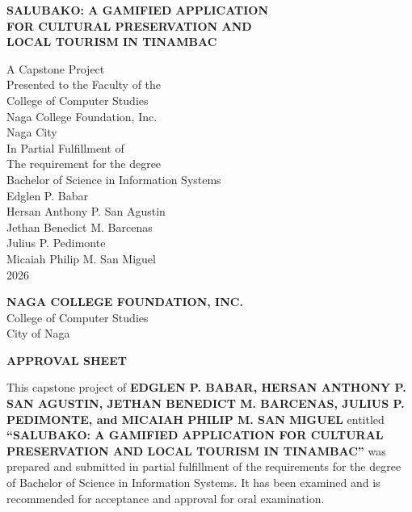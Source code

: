 \documentclass{research}
\newcommand{\ncfletterhead}{%
  \begin{center}
    {\bfseries NAGA COLLEGE FOUNDATION, INC.}\\[0.3em]
    College of Computer Studies\\[0.3em]
    City of Naga
  \end{center}
  \vspace{1em}
}
\begin{document}
\thispagestyle{empty}
\begin{center}
  \vspace*{1in}
  {\large\bfseries SALUBAKO: A GAMIFIED APPLICATION\\ 
  FOR CULTURAL PRESERVATION AND \\
  LOCAL TOURISM IN TINAMBAC \par}
  \vspace{0.75in}
  A Capstone Project\\
  Presented to the Faculty of the\\
  College of Computer Studies\\
  Naga College Foundation, Inc.\\
  Naga City\\
  \vspace{0.75in}
  In Partial Fulfillment of\\
  The requirement for the degree\\
  Bachelor of Science in Information Systems\\
  \vspace{0.5in}
  Edglen P. Babar\\
  Hersan Anthony P. San Agustin\\
  Jethan Benedict M. Barcenas\\
  Julius P. Pedimonte\\
  Micaiah Philip M. San Miguel\\
  \vspace*{0.5in}
  2026
\end{center}
\clearpage

\setcounter{page}{2}
\ncfletterhead

\begin{center}
  {\bfseries APPROVAL SHEET}
\end{center}

\vspace{0.5em}

\noindent
This capstone project of \textbf{EDGLEN P. BABAR, HERSAN ANTHONY P. SAN AGUSTIN,
JETHAN BENEDICT M. BARCENAS, JULIUS P. PEDIMONTE, and MICAIAH PHILIP M. SAN MIGUEL}
entitled \textbf{``SALUBAKO: A GAMIFIED APPLICATION FOR CULTURAL PRESERVATION AND LOCAL
TOURISM IN TINAMBAC''} was prepared and submitted in partial fulfillment of the
requirements for the degree of Bachelor of Science in Information Systems.
It has been examined and is recommended for acceptance and approval for oral
examination.
\end{document}
